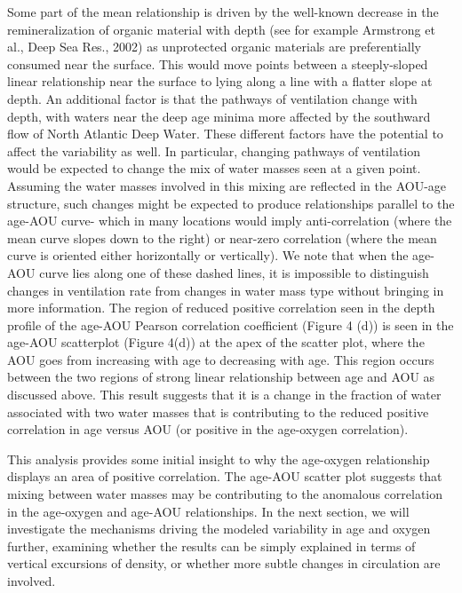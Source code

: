 Some part of the mean relationship is driven by the well-known decrease in the remineralization of organic material with depth (see for example Armstrong et al., Deep Sea Res., 2002) as unprotected organic materials are preferentially consumed near the surface. This would move points between a steeply-sloped linear relationship near the surface to lying along a line with a flatter slope at depth. An additional factor is that the pathways of ventilation change with depth, with waters near the deep age minima more affected by the southward flow of North Atlantic Deep Water. These different factors have the potential to affect the variability as well. In particular, changing pathways of ventilation would be expected to change the mix of water masses seen at a given point. Assuming the water masses involved in this mixing are reflected in the AOU-age structure, such changes might be expected to produce relationships parallel to the age-AOU curve- which in many locations would imply anti-correlation (where the mean curve slopes down to the right) or near-zero correlation (where the mean curve is oriented either horizontally or vertically). We note that when the age-AOU curve lies along one of these dashed lines, it is impossible to distinguish changes in ventilation rate from changes in water mass type without bringing in more information.
The region of reduced positive correlation seen in the depth profile of the age-AOU Pearson correlation coefficient (Figure 4 (d)) is seen in the age-AOU scatterplot (Figure 4(d)) at the apex of the scatter plot, where the AOU goes from increasing with age to decreasing with age. This region occurs between the two regions of strong linear relationship between age and AOU as discussed above. This result suggests that it is a change in the fraction of water associated with two water masses that is contributing to the reduced positive correlation in age versus AOU (or positive in the age-oxygen correlation).

This analysis provides some initial insight to why the age-oxygen relationship displays an area of positive correlation. The age-AOU scatter plot suggests that mixing between water masses may be contributing to the anomalous correlation in the age-oxygen and age-AOU relationships. In the next section, we will investigate the mechanisms driving the modeled variability in age and oxygen further, examining whether the results can be simply explained in terms of vertical excursions of density, or whether more subtle changes in circulation are involved.


